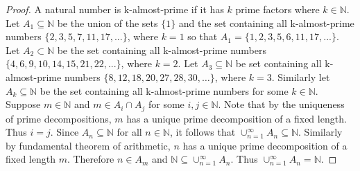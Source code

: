\documentclass[12pt]{article}
\newcommand{\NN}{\ensuremath{\mathbb N}}
\begin{document}
\begin{proof}
	A natural number is k-almost-prime if it has $k$ prime factors where $k \in \NN$.
	Let $A_1 \subseteq \NN$ be the union of the sets $\{1\}$ and the set containing all k-almost-prime numbers $\{2,3,5,7,11,17, ...\}$, where $k = 1$ so that $A_1 = \{1,2,3,5,6,11,17,...\}$. Let $A_2 \subset \NN$ be the set containing all k-almost-prime numbers $\{4,6,9,10,14,15,21,22,...\}$, where $k = 2$. Let $A_3 \subseteq \NN$ be set containing all k-almost-prime numbers $\{8, 12, 18, 20, 27, 28, 30, … \}$, where $k = 3$. Similarly let $A_k \subseteq \NN$ be the set containing all k-almost-prime numbers for some $k \in \NN$. Suppose $m \in \NN$ and $m \in A_i \cap A_j$ for some $i, j \in \NN$. Note that by the uniqueness of prime decompositions, $m$ has a unique prime decomposition of a fixed length. Thus $i = j$. Since $A_n \subseteq \NN$ for all $n \in \NN$, it follows that $\cup_{n=1}^{\infty}A_n \subseteq \NN$. Similarly by fundamental theorem of arithmetic, $n$ has a unique prime decomposition of a fixed length $m$. Therefore $n \in A_m$ and $\NN \subseteq \cup_{n=1}^{\infty} A_n$. Thus $\cup_{n=1}^{\infty} A_n = \NN$.
\end{proof}
\end{document}
